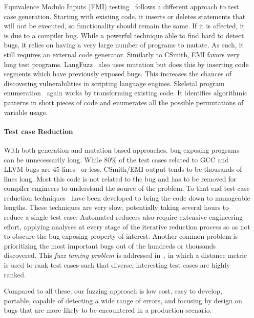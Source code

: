 Equivalence Modulo Inputs (EMI) testing~\cite{Le2013a,Sun2016a} follows a different approach to test case generation. Starting with existing code, it inserts or deletes statements that will not be executed, so functionality should remain the same. If it is affected, it is due to a compiler bug. While a powerful technique able to find hard to detect bugs, it relies on having a very large number of programs to mutate. As such, it still requires an external code generator. Similarly to CSmith, EMI favors very long test programs. LangFuzz~\cite{Holler2012} also uses mutation but does this by inserting code segments which have previously exposed bugs. This increases the chances of discovering vulnerabilities in scripting language engines.
Skeletal program enumeration~\cite{Zhang2017a} again works by transforming existing code. It identifies algorithmic patterns in short pieces of code and enumerates all the possible permutations of variable usage.

\paragraph{Test case Reduction} With both generation and mutation based approaches, bug-exposing programs can be unnecessarily long. While 80\% of the test cases related to GCC and LLVM bugs are 45 lines~\cite{Sun2016} or less, CSmith/EMI output tends to be thousands of lines long. Most this code is not related to the bug and has to be removed for compiler engineers to understand the source of the problem. To that end test case reduction techniques~\cite{Regehr2012a,Pflanzer2016,Herfert} have been developed to bring the code down to manageable lengths. These techniques are very slow, potentially taking several hours to reduce a single test case. Automated reducers also require extensive engineering effort, applying analyses at every stage of the iterative reduction process so as not to obscure the bug-exposing property of interest. Another common problem is prioritizing the most important bugs out of the hundreds or thousands discovered. This \emph{fuzz taming problem} is addressed in~\cite{Chen2013}, in which a distance metric is used to rank test cases such that diverse, interesting test cases are highly ranked. %

Compared to all these, our fuzzing approach is low cost, easy to develop, portable, capable of detecting a wide range of errors, and focusing by design on bugs that are more likely to be encountered in a production scenario.


